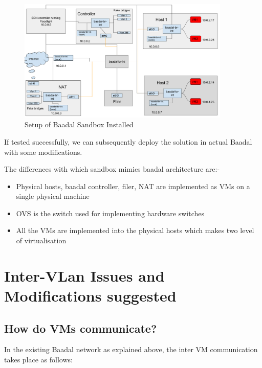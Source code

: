 \begin{figure}[h]
\caption{Setup of Baadal Sandbox Installed }
\centering
\includegraphics[width=0.9\textwidth]{baadal_networking_diagram}
\end{figure}

If tested successfully, we can subsequently deploy the solution in actual Baadal with some modifications.

The differences with which sandbox mimics baadal architecture are:-

\begin{itemize}
    \item Physical hosts, baadal controller, filer, NAT are implemented as VMs on a single physical machine
    \item OVS is the switch used for implementing hardware switches
    \item All the VMs are implemented into the physical hosts which makes two level of virtualisation
\end{itemize}



\section{Inter-VLan Issues and Modifications suggested}

\subsection{How do VMs communicate?
}
In the existing
Baadal network as explained above, the inter VM communication takes place
as follows:


